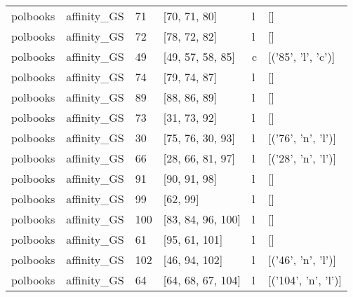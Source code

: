 \begin{tabular}{llllll}
polbooks & affinity_GS & 71 & [70, 71, 80] & l & [] \\
polbooks & affinity_GS & 72 & [78, 72, 82] & l & [] \\
polbooks & affinity_GS & 49 & [49, 57, 58, 85] & c & [('85', 'l', 'c')] \\
polbooks & affinity_GS & 74 & [79, 74, 87] & l & [] \\
polbooks & affinity_GS & 89 & [88, 86, 89] & l & [] \\
polbooks & affinity_GS & 73 & [31, 73, 92] & l & [] \\
polbooks & affinity_GS & 30 & [75, 76, 30, 93] & l & [('76', 'n', 'l')] \\
polbooks & affinity_GS & 66 & [28, 66, 81, 97] & l & [('28', 'n', 'l')] \\
polbooks & affinity_GS & 91 & [90, 91, 98] & l & [] \\
polbooks & affinity_GS & 99 & [62, 99] & l & [] \\
polbooks & affinity_GS & 100 & [83, 84, 96, 100] & l & [] \\
polbooks & affinity_GS & 61 & [95, 61, 101] & l & [] \\
polbooks & affinity_GS & 102 & [46, 94, 102] & l & [('46', 'n', 'l')] \\
polbooks & affinity_GS & 64 & [64, 68, 67, 104] & l & [('104', 'n', 'l')] \\
\bottomrule
\end{tabular}


